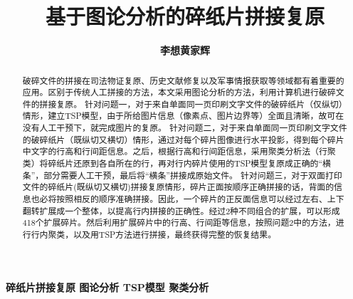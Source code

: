 \documentclass[12pt]{article}
\title{\textbf{基于图论分析的碎纸片拼接复原}}  %
\author{\textbf {李\quad 想\qquad 黄家辉}}  %
\date{} %
\begin{document}
    \maketitle %
     \begin{abstract} 
    \renewcommand{\abstractname}{\large Abstract\\}
    破碎文件的拼接在司法物证复原、历史文献修复以及军事情报获取等领域都有着重要的应用。区别于传统人工拼接的方法，本文采用图论分析的方法，利用计算机进行破碎文件的拼接复原。
    针对问题一，对于来自单面同一页印刷文字文件的破碎纸片（仅纵切）情形，建立TSP模型，由于所给图片信息（像素点、图片边界等）全面且清晰，故可在没有人工干预下，就完成图片的复原。
    针对问题二，对于来自单面同一页印刷文字文件的破碎纸片（既纵切又横切）情形，通过对每个碎片图像进行水平投影，得到每个碎片中文字的行高和行间距信息。之后，根据行高和行间距信息，采用聚类分析法（行聚类）将碎纸片还原到各自所在的行，再对行内碎片使用的TSP模型复原成正确的“横条”，部分需要人工干预，最后将“横条”拼接成原始文件。
    针对问题三，对于双面打印文件的碎纸片(既纵切又横切)拼接复原情形，碎片正面按顺序正确拼接的话，背面的信息也必将按照相反的顺序准确拼接。因此，一个碎片的正反面信息可以经过左右、上下翻转扩展成一个整体，以提高行内拼接的正确性。经过2种不同组合的扩展，可以形成418个扩展碎片。然后利用扩展碎片中的行高、行间距等信息，按照问题2中的方法，进行行内聚类，以及用TSP方法进行拼接，最终获得完整的恢复结果。
\par    

         \end{abstract}

   { \textbf{{\kaishu{}}{\songti{}碎纸片拼接复原 \quad  图论分析 \quad TSP模型 \quad  聚类分析 }}}
\end{document}
